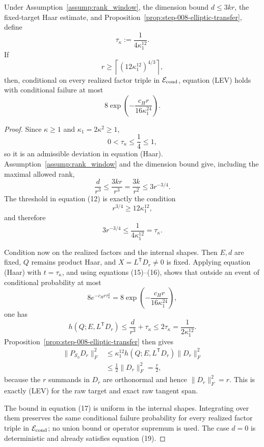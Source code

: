 \begin{proposition}
\label{prop:step-008-raw-leverage}
Under Assumption~\ref{assump:rank_window}, the dimension bound
\(d\le3kr\), the fixed-target Haar estimate, and
Proposition~\ref{prop:step-008-elliptic-transfer}, define
\[
  \tau_\kappa:=\frac1{4\kappa_1^{12}}.                     \tag{11}
\]
If
\[
  r\ge\left\lceil(12\kappa_1^{12})^{4/3}\right\rceil,     \tag{12}
\]
then, conditional on every realized factor triple in
\(\mathcal E_{\rm cond}\), equation (LEV) holds with conditional failure at
most
\[
  8\exp\!\left(-\frac{c_Hr}{16\kappa_1^{24}}\right).
                                                               \tag{13}
\]

\end{proposition}

\begin{proof}
Since \(\kappa\ge1\) and
\(\kappa_1=2\kappa^2\ge1\),
\[
  0<\tau_\kappa\le\frac14\le1,                            \tag{14}
\]
so it is an admissible deviation in equation (Haar). Assumption~\ref{assump:rank_window}
and the dimension bound give, including the maximal allowed rank,
\[
  \frac d{r^3}
  \le\frac{3kr}{r^3}
  =\frac{3k}{r^2}
  \le3r^{-3/4}.                                             \tag{15}
\]
The threshold in equation (12) is exactly the condition
\[
  r^{3/4}\ge12\kappa_1^{12},
\]
and therefore
\[
  3r^{-3/4}\le\frac1{4\kappa_1^{12}}=\tau_\kappa.          \tag{16}
\]

Condition now on the realized factors and the internal shapes. Then
\(E,d\) are fixed, \(Q\) remains product Haar, and
\(X=L^{\mathsf T}D_r\ne0\) is fixed. Applying equation (Haar) with
\(t=\tau_\kappa\), and using equations (15)--(16), shows that outside an
event of conditional probability at most
\[
  8e^{-c_Hr\tau_\kappa^2}
  =8\exp\!\left(-\frac{c_Hr}{16\kappa_1^{24}}\right),       \tag{17}
\]
one has
\[
  h(Q;E,L^{\mathsf T}D_r)
  \le\frac d{r^3}+\tau_\kappa
  \le2\tau_\kappa
  =\frac1{2\kappa_1^{12}}.                                 \tag{18}
\]
Proposition~\ref{prop:step-008-elliptic-transfer} then gives
\[
\begin{aligned}
  \|P_{\mathscr S_0}D_r\|_F^2
  &\le\kappa_1^{12}h(Q;E,L^{\mathsf T}D_r)\|D_r\|_F^2\\
  &\le\frac12\|D_r\|_F^2
   =\frac r2,
\end{aligned}\tag{19}
\]
because the \(r\) summands in \(D_r\) are orthonormal and hence
\(\|D_r\|_F^2=r\). This is exactly (LEV) for the raw target and exact raw
tangent span.

The bound in equation (17) is uniform in the internal shapes. Integrating
over them preserves the same conditional failure probability for every
realized factor triple in \(\mathcal E_{\rm cond}\); no union bound or
operator supremum is used. The case \(d=0\) is deterministic and already
satisfies equation (19). 

\end{proof}


